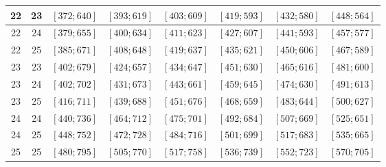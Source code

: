 \documentclass[a4paper,12pt]{article}
\begin{document}
\begin{center}
{\begin{longtable}[H]{|c|c|c|c|c|c|c|c|}
22 &  23 &  $\left[ 372; 640\right]$ &  $\left[ 393; 619\right]$ &  $\left[ 403; 609\right]$ &  $\left[ 419; 593\right]$ &  $\left[ 432; 580\right]$ &  $\left[ 448; 564\right]$ \tabularnewline \hline
22 &  24 &  $\left[ 379; 655\right]$ &  $\left[ 400; 634\right]$ &  $\left[ 411; 623\right]$ &  $\left[ 427; 607\right]$ &  $\left[ 441; 593\right]$ &  $\left[ 457; 577\right]$ \tabularnewline \hline
22 &  25 &  $\left[ 385; 671\right]$ &  $\left[ 408; 648\right]$ &  $\left[ 419; 637\right]$ &  $\left[ 435; 621\right]$ &  $\left[ 450; 606\right]$ &  $\left[ 467; 589\right]$ \tabularnewline \hline
23 &  23 &  $\left[ 402; 679\right]$ &  $\left[ 424; 657\right]$ &  $\left[ 434; 647\right]$ &  $\left[ 451; 630\right]$ &  $\left[ 465; 616\right]$ &  $\left[ 481; 600\right]$ \tabularnewline \hline
23 &  24 &  $\left[ 402; 702\right]$ &  $\left[ 431; 673\right]$ &  $\left[ 443; 661\right]$ &  $\left[ 459; 645\right]$ &  $\left[ 474; 630\right]$ &  $\left[ 491; 613\right]$ \tabularnewline \hline
23 &  25 &  $\left[ 416; 711\right]$ &  $\left[ 439; 688\right]$ &  $\left[ 451; 676\right]$ &  $\left[ 468; 659\right]$ &  $\left[ 483; 644\right]$ &  $\left[ 500; 627\right]$ \tabularnewline \hline
24 &  24 &  $\left[ 440; 736\right]$ &  $\left[ 464; 712\right]$ &  $\left[ 475; 701\right]$ &  $\left[ 492; 684\right]$ &  $\left[ 507; 669\right]$ &  $\left[ 525; 651\right]$ \tabularnewline \hline
24 &  25 &  $\left[ 448; 752\right]$ &  $\left[ 472; 728\right]$ &  $\left[ 484; 716\right]$ &  $\left[ 501; 699\right]$ &  $\left[ 517; 683\right]$ &  $\left[ 535; 665\right]$ \tabularnewline \hline
25 &  25 &  $\left[ 480; 795\right]$ &  $\left[ 505; 770\right]$ &  $\left[ 517; 758\right]$ &  $\left[ 536; 739\right]$ &  $\left[ 552; 723\right]$ &  $\left[ 570; 705\right]$ \tabularnewline \hline
\end{longtable}
}
\end{center}

\newpage
\end{document}
